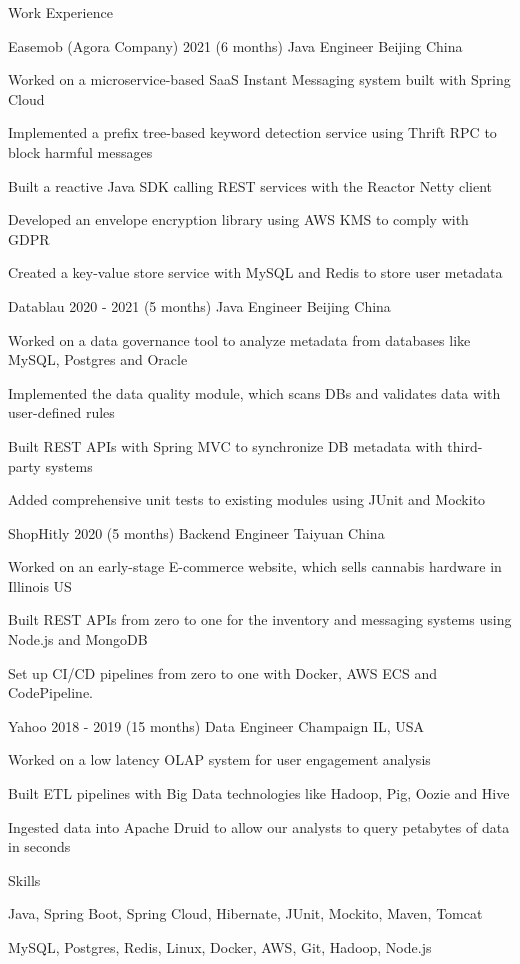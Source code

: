 \documentclass{resume} %
\begin{document}
\begin{rSection}{Work Experience}

\begin{rSubsection}
{Easemob (Agora Company)} {2021 (6 months)} {Java Engineer} {Beijing China}
\item Worked on a microservice-based SaaS Instant Messaging system built with Spring Cloud
\item Implemented a prefix tree-based keyword detection service using Thrift RPC to block harmful messages
\item Built a reactive Java SDK calling REST services with the Reactor Netty client
\item Developed an envelope encryption library using AWS KMS to comply with GDPR
\item Created a key-value store service with MySQL and Redis to store user metadata
\end{rSubsection}

\begin{rSubsection}
{Datablau} {2020 - 2021 (5 months)} {Java Engineer} {Beijing China}
\item Worked on a data governance tool to analyze metadata from databases like MySQL, Postgres and Oracle
\item Implemented the data quality module, which scans DBs and validates data with user-defined rules
\item Built REST APIs with Spring MVC to synchronize DB metadata with third-party systems
\item Added comprehensive unit tests to existing modules using JUnit and Mockito
\end{rSubsection}

\begin{rSubsection}
{ShopHitly} {2020 (5 months)} {Backend Engineer} {Taiyuan China}
\item Worked on an early-stage E-commerce website, which sells cannabis hardware in Illinois US
\item Built REST APIs from zero to one for the inventory and messaging systems using Node.js and MongoDB
\item Set up CI/CD pipelines from zero to one with Docker, AWS ECS and CodePipeline.
\end{rSubsection}

\begin{rSubsection}
{Yahoo} {2018 - 2019 (15 months)} {Data Engineer} {Champaign IL, USA}
\item Worked on a low latency OLAP system for user engagement analysis
\item Built ETL pipelines with Big Data technologies like Hadoop, Pig, Oozie and Hive
\item Ingested data into Apache Druid to allow our analysts to query petabytes of data in seconds
\end{rSubsection}

\end{rSection}

\begin{skillSection}{Skills}
\item Java, Spring Boot, Spring Cloud, Hibernate, JUnit, Mockito, Maven, Tomcat
\item MySQL, Postgres, Redis, Linux, Docker, AWS, Git, Hadoop, Node.js
\end{skillSection}
\end{document}
